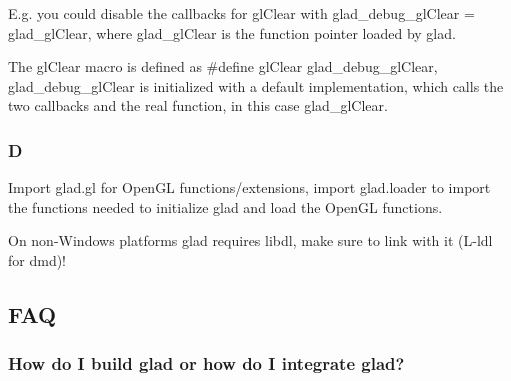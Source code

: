 E.\+g. you could disable the callbacks for gl\+Clear with {\ttfamily glad\+\_\+debug\+\_\+gl\+Clear = glad\+\_\+gl\+Clear}, where {\ttfamily glad\+\_\+gl\+Clear} is the function pointer loaded by glad.

The {\ttfamily gl\+Clear} macro is defined as {\ttfamily \#define gl\+Clear glad\+\_\+debug\+\_\+gl\+Clear}, {\ttfamily glad\+\_\+debug\+\_\+gl\+Clear} is initialized with a default implementation, which calls the two callbacks and the real function, in this case {\ttfamily glad\+\_\+gl\+Clear}.

\subsubsection*{D}

Import {\ttfamily glad.\+gl} for Open\+GL functions/extensions, import {\ttfamily glad.\+loader} to import the functions needed to initialize glad and load the Open\+GL functions.




On non-\/\+Windows platforms glad requires {\ttfamily libdl}, make sure to link with it ({\ttfamily L-\/ldl} for dmd)!

\subsection*{F\+AQ}

\subsubsection*{How do I build glad or how do I integrate glad?}

